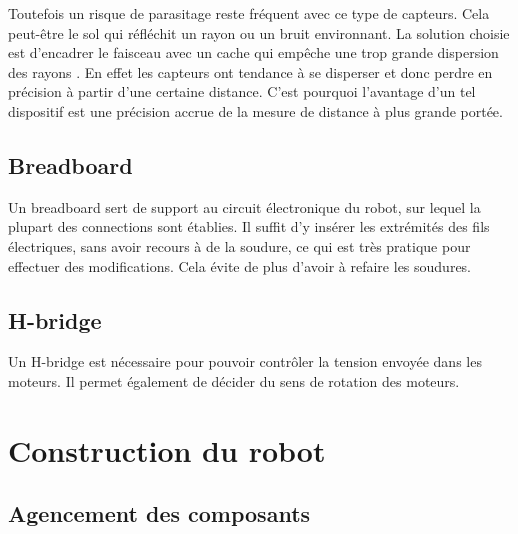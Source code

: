 \documentclass[a4paper,11pt]{article}
\begin{document}
Toutefois un risque de parasitage reste fréquent avec ce type de capteurs. Cela peut-être le sol qui réfléchit un rayon ou un bruit environnant. La solution choisie est d'encadrer le faisceau avec un cache qui empêche une trop grande dispersion des rayons \cite{Parasites_capteurs_sharp}. En effet les capteurs ont tendance à se disperser et donc perdre en précision à partir d'une certaine distance. C'est pourquoi l'avantage d'un tel dispositif est une précision accrue de la mesure de distance à plus grande portée.

\subsection{Breadboard}
 
Un breadboard sert de support au circuit électronique du robot, sur lequel la plupart des connections sont établies. Il suffit d'y insérer les extrémités des fils électriques, sans avoir recours à de la soudure, ce qui est très pratique pour effectuer des modifications. Cela évite de plus d'avoir à refaire les soudures.

\subsection{H-bridge}

Un H-bridge est nécessaire pour pouvoir contrôler la tension envoyée dans les moteurs. Il permet également de décider du sens de rotation des moteurs.

\section{Construction du robot}

\subsection{Agencement des composants}
\end{document}
